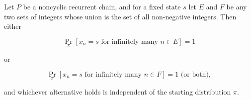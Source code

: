 Let $P$ be a noncyclic recurrent chain, and for a fixed state $s$ let $E$ and $F$ be any two sets of integers whose union is the set of all non-negative integers. Then either

$$\Pr_{\pi}[x_n = s \text{ for infinitely many } n \in E] = 1$$

or

$$\Pr_{\pi}[x_n = s \text{ for infinitely many } n \in F] = 1 \text{ (or both)},$$

and whichever alternative holds is independent of the starting distribution $\pi$.
